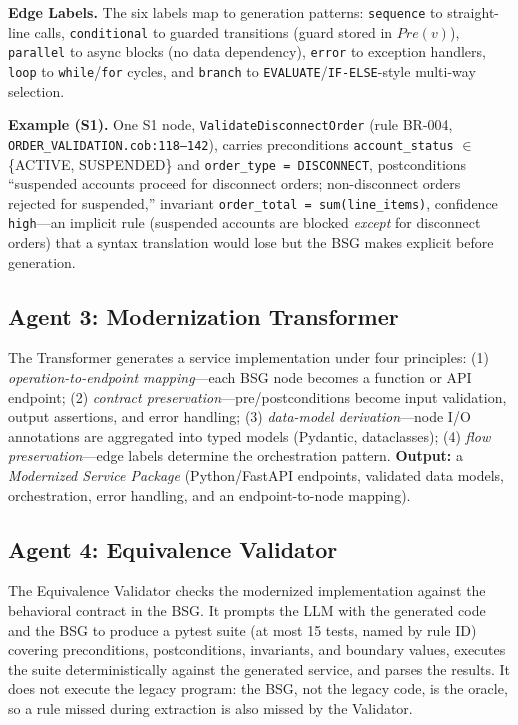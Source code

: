 \documentclass[conference]{IEEEtran}
\begin{document}
\textbf{Edge Labels.} The six labels map to generation patterns: \texttt{sequence} to straight-line calls, \texttt{conditional} to guarded transitions (guard stored in $Pre(v)$), \texttt{parallel} to async blocks (no data dependency), \texttt{error} to exception handlers, \texttt{loop} to \texttt{while}/\texttt{for} cycles, and \texttt{branch} to \texttt{EVALUATE}/\texttt{IF-ELSE}-style multi-way selection.

\textbf{Example (S1).} One S1 node, \texttt{ValidateDisconnectOrder} (rule BR-004, \texttt{ORDER\_VALIDATION.cob:118--142}), carries preconditions \texttt{account\_status} $\in$ \{ACTIVE, SUSPENDED\} and \texttt{order\_type = DISCONNECT}, postconditions ``suspended accounts proceed for disconnect orders; non-disconnect orders rejected for suspended,'' invariant \texttt{order\_total = sum(line\_items)}, confidence \texttt{high}---an implicit rule (suspended accounts are blocked \textit{except} for disconnect orders) that a syntax translation would lose but the BSG makes explicit before generation.

\subsection{Agent 3: Modernization Transformer}

The Transformer generates a service implementation under four principles: (1) \textit{operation-to-endpoint mapping}---each BSG node becomes a function or API endpoint; (2) \textit{contract preservation}---pre/postconditions become input validation, output assertions, and error handling; (3) \textit{data-model derivation}---node I/O annotations are aggregated into typed models (Pydantic, dataclasses); (4) \textit{flow preservation}---edge labels determine the orchestration pattern. \textbf{Output:} a \textit{Modernized Service Package} (Python/FastAPI endpoints, validated data models, orchestration, error handling, and an endpoint-to-node mapping).

\subsection{Agent 4: Equivalence Validator}

The Equivalence Validator checks the modernized implementation against the behavioral contract in the BSG. It prompts the LLM with the generated code and the BSG to produce a pytest suite (at most 15 tests, named by rule ID) covering preconditions, postconditions, invariants, and boundary values, executes the suite deterministically against the generated service, and parses the results. It does not execute the legacy program: the BSG, not the legacy code, is the oracle, so a rule missed during extraction is also missed by the Validator.
\end{document}
